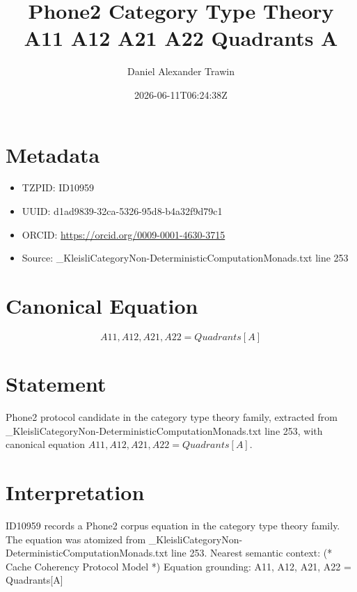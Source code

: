 \documentclass[11pt]{article}
\title{Phone2 Category Type Theory A11 A12 A21 A22 Quadrants A}
\author{Daniel Alexander Trawin}
\date{2026-06-11T06:24:38Z}
\begin{document}
\maketitle
\section*{Metadata}
\begin{itemize}
\item TZPID: ID10959
\item UUID: d1ad9839-32ca-5326-95d8-b4a32f9d79c1
\item ORCID: \url{https://orcid.org/0009-0001-4630-3715}
\item Source: _KleisliCategoryNon-DeterministicComputationMonads.txt line 253
\end{itemize}
\section*{Canonical Equation}
\[
{A11, A12, A21, A22} = Quadrants[A]
\]
\section*{Statement}
Phone2 protocol candidate in the category type theory family, extracted from _KleisliCategoryNon-DeterministicComputationMonads.txt line 253, with canonical equation ${A11, A12, A21, A22} = Quadrants[A]$.
\section*{Interpretation}
ID10959 records a Phone2 corpus equation in the category type theory family. The equation was atomized from _KleisliCategoryNon-DeterministicComputationMonads.txt line 253. Nearest semantic context: (* Cache Coherency Protocol Model *) Equation grounding: {A11, A12, A21, A22} = Quadrants[A]
\end{document}
